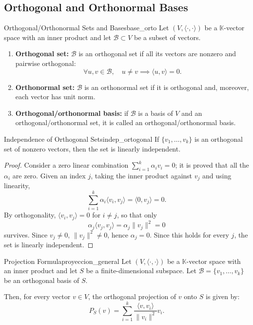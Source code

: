 \documentclass[11pt, a4paper]{article}
\begin{document}
\subsection{Orthogonal and Orthonormal Bases}

\begin{definicion}{Orthogonal/Orthonormal Sets and Bases}{base_orto}
Let $(V, \langle \cdot, \cdot \rangle)$ be a $\mathbb{K}$-vector space with an inner product and let $\mathcal{B} \subset V$ be a subset of vectors.

\begin{enumerate}
    \item \textbf{Orthogonal set:} $\mathcal{B}$ is an orthogonal set if all its vectors are nonzero and pairwise orthogonal:
    \[
    \forall u, v \in \mathcal{B}, \quad u \neq v \implies \langle u, v \rangle = 0.
    \]

    \item \textbf{Orthonormal set:} $\mathcal{B}$ is an orthonormal set if it is orthogonal and, moreover, each vector has unit norm.

    \item \textbf{Orthogonal/orthonormal basis:} if $\mathcal{B}$ is a basis of $V$ and an orthogonal/orthonormal set, it is called an orthogonal/orthonormal basis.
\end{enumerate}
\end{definicion}

\begin{proposicion}{Independence of Orthogonal Sets}{indep_ortogonal}
If $\{v_1, \dots, v_k\}$ is an orthogonal set of nonzero vectors, then the set is linearly independent.
\end{proposicion}

\begin{proof}
Consider a zero linear combination $\sum_{i=1}^{k} \alpha_i v_i = 0$; it is proved that all the $\alpha_i$ are zero. Given an index $j$, taking the inner product against $v_j$ and using linearity,
\[
\sum_{i=1}^{k} \alpha_i \langle v_i, v_j \rangle = \langle 0, v_j \rangle = 0.
\]
By orthogonality, $\langle v_i, v_j \rangle = 0$ for $i \neq j$, so that only
\[
\alpha_j \langle v_j, v_j \rangle = \alpha_j \|v_j\|^2 = 0
\]
survives. Since $v_j \neq 0$, $\|v_j\|^2 \neq 0$, hence $\alpha_j = 0$. Since this holds for every $j$, the set is linearly independent.
\end{proof}

\begin{teorema}{Projection Formula}{proyeccion_general}
Let $(V, \langle \cdot, \cdot \rangle)$ be a $\mathbb{K}$-vector space with an inner product and let $S$ be a finite-dimensional subspace.
Let $\mathcal{B} = \{v_1, \dots, v_k\}$ be an orthogonal basis of $S$.

Then, for every vector $v \in V$, the orthogonal projection of $v$ onto $S$ is given by:
\[
P_S(v) = \sum_{i=1}^{k} \frac{\langle v, v_i \rangle}{\|v_i\|^2} v_i.
\]
\end{teorema}
\end{document}
